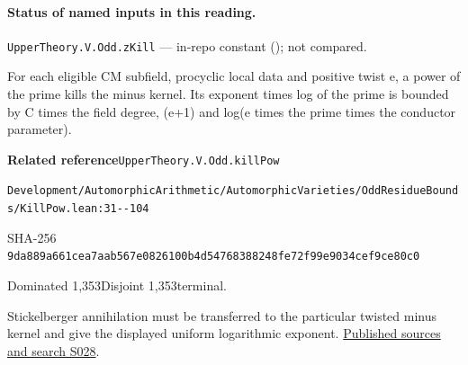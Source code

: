 

\paragraph{Status of named inputs in this reading.}
\noindent\nolinkurl{UpperTheory.V.Odd.zKill} --- in-repo constant (); not compared.\par

\begin{formalstatement}[D551]\label{decomp:D551}
For each eligible CM subfield, procyclic local data and positive twist e, a power of the prime kills the minus kernel. Its exponent times log of the prime is bounded by C times the field degree, (e+1) and log(e times the prime times the conductor parameter).
\end{formalstatement}
{\small\raggedright\noindent\textsf{\bfseries Related reference}\quad \nolinkurl{UpperTheory.V.Odd.killPow}\par\noindent \nolinkurl{Development/AutomorphicArithmetic/AutomorphicVarieties/OddResidueBounds/KillPow.lean:31--104}\par\noindent SHA-256 \nolinkurl{9da889a661cea7aab567e0826100b4d54768388248fe72f99e9034cef9ce80c0}\par\noindent Dominated 1,353\quad Disjoint 1,353\quad terminal.\par}
Stickelberger annihilation must be transferred to the particular twisted minus kernel and give the displayed uniform logarithmic exponent.
\hyperref[lit:S028]{Published sources and search S028}.
